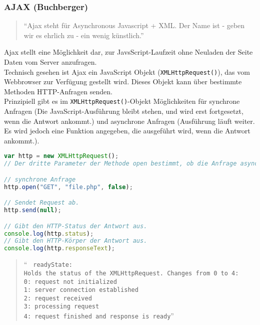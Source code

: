 \subsubsection{AJAX (Buchberger)} 
\label{sec:content_js_AJAX}
\begin{quote}
\enquote{Ajax steht für Asynchronous Javascript + XML. Der Name ist - geben wir es ehrlich zu - ein wenig künstlich.} \cite[S. 317]{ajax}
\end{quote}
Ajax stellt eine Möglichkeit dar, zur JavsScript-Laufzeit ohne Neuladen der Seite Daten vom Server anzufragen.\\
Technisch gesehen ist Ajax ein JavaScript Objekt (\texttt{XMLHttpRequest()}), das vom Webbrowser zur Verfügung gestellt wird. Dieses Objekt kann über bestimmte Methoden HTTP-Anfragen senden.\\
Prinzipiell gibt es im \texttt{XMLHttpRequest()}-Objekt Möglichkeiten für synchrone Anfragen (Die JavaScript-Ausführung bleibt stehen, und wird erst fortgesetzt, wenn die Antwort ankommt.) und asynchrone Anfragen (Ausführung läuft weiter. Es wird jedoch eine Funktion angegeben, die ausgeführt wird, wenn die Antwort ankommt.).\\
\begin{lstlisting}[style=custom, language=JavaScript,  caption={Synchrones AJAX},label={lst:content_ajax_0}]
var http = new XMLHttpRequest();
// Der dritte Parameter der Methode open bestimmt, ob die Anfrage asynchron sein soll.

// synchrone Anfrage
http.open("GET", "file.php", false);

// Sendet Request ab.
http.send(null);

// Gibt den HTTP-Status der Antwort aus.
console.log(http.status);
// Gibt den HTTP-Körper der Antwort aus.
console.log(http.responseText);
\end{lstlisting}
\begin{quote}
\enquote{
\texttt{
readyState:\\
Holds the status of the XMLHttpRequest. Changes from 0 to 4:\\
0: request not initialized\\
1: server connection established\\
2: request received\\
3: processing request\\ 
4: request finished and response is ready}}\\
\cite[\href{http://www.w3schools.com/ajax/ajax_xmlhttprequest_onreadystatechange.asp}{http://www.w3schools.com/ajax/ajax\_xmlhttprequest\_\\onreadystatechange.asp}]{w3schools}
\end{quote}
